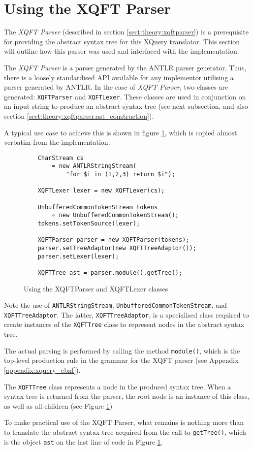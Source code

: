 \section{Using the XQFT Parser}
The \textit{XQFT Parser}\cite{ourselves} (described in section
\ref{sect:theory:xqftparser}) is a prerequisite for providing the abstract
syntax tree for this XQuery translator. This section will outline how this
parser was used and interfaced with the implementation.

The \textit{XQFT Parser} is a parser generated by the ANTLR parser generator.
Thus, there is a loosely standardised API available for any implementor
utilising a parser generated by ANTLR. In the case of \textit{XQFT Parser}, two
classes are generated: \texttt{XQFTParser} and \texttt{XQFTLexer}. These
classes are used in conjunction on an input string to produce an abstract syntax
tree (see next subsection, and also section
\ref{sect:theory:xqftparser:ast_construction}).

A typical use case to achieve this is shown in figure
\ref{figure:impl:using_xqft}, which is copied almost verbatim from the
implementation.

\begin{figure}[!htp]
\begin{center}
  \begin{Verbatim}
    CharStream cs 
        = new ANTLRStringStream(
            "for $i in (1,2,3) return $i");

    XQFTLexer lexer = new XQFTLexer(cs);

    UnbufferedCommonTokenStream tokens 
        = new UnbufferedCommonTokenStream();
	tokens.setTokenSource(lexer);

    XQFTParser parser = new XQFTParser(tokens);
    parser.setTreeAdaptor(new XQFTTreeAdaptor());
    parser.setLexer(lexer);

    XQFTTree ast = parser.module().getTree();
  \end{Verbatim}
  \caption{Using the XQFTParser and XQFTLexer classes}
  \label{figure:impl:using_xqft}
\end{center}
\end{figure}
Note the use of \texttt{ANTLRStringStream},
\texttt{UnbufferedCommonTokenStream}, and \texttt{XQFTTreeAdaptor}. The latter,
\texttt{XQFTTreeAdaptor}, is a specialised class required to create instances of
the \texttt{XQFTTree} class to represent nodes in the abstract syntax tree.

The actual parsing is performed by calling the method \texttt{module()}, which
is the top-level production rule in the grammar for the XQFT parser (see
Appendix \ref{appendix:xquery_ebnf}).

The \texttt{XQFTTree} class represents a node in the produced syntax tree. When
a syntax tree is returned from the parser, the root node is an instance of this
class, as well as all children (see Figure \ref{figure:impl:using_xqft})

To make practical use of the XQFT Parser, what remains is nothing more than to
translate the abstract syntax tree acquired from the call to
\texttt{getTree()}, which is the object \texttt{ast} on the last line of code
in Figure \ref{figure:impl:using_xqft}.
